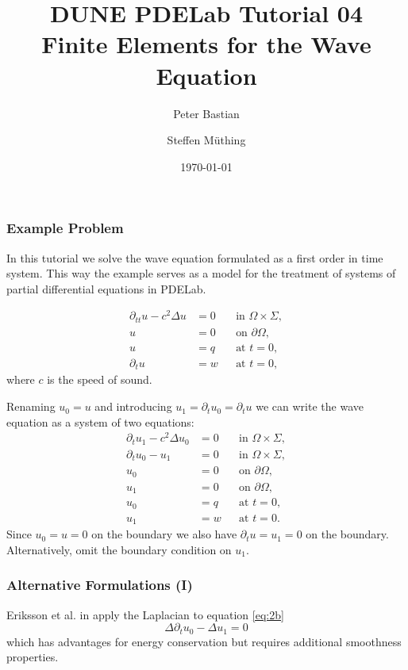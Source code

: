 \documentclass[ignorenonframetext,11pt]{beamer}
\title{DUNE PDELab Tutorial 04\\
  {\small Finite Elements for the Wave Equation}}
\author{Peter Bastian \and Steffen Müthing}
\institute[]
  {
   Interdisziplinäres Zentrum für Wissenschaftliches Rechnen\\
   Im Neuenheimer Feld 368, D-69120 Heidelberg \\[6pt]
  }
\date[\today]{\today}
\theoremstyle{definition}
\begin{document}
\frame{\titlepage}



\begin{frame}
\frametitle{Example Problem}
 In this tutorial we solve the wave equation formulated as a first order
in time system. This way the example serves as a model for the
treatment of systems of partial differential equations in PDELab.

\begin{subequations}
\label{eq:WaveEquation}
\begin{align}
\partial_{tt} u-c^2\Delta u  &= 0 &&\text{in $\Omega\times\Sigma$},\\
u &= 0 &&\text{on $\partial\Omega$},\\
u &= q &&\text{at $t=0$},\\
\partial_t u &= w &&\text{at $t=0$},
\end{align}
\end{subequations}
where $c$ is the speed of sound.
\end{frame}
\begin{frame}
Renaming $u_0=u$ and introducing $u_1=\partial_t u_0 =\partial_t u$ we can write the wave equation as a system of two equations:
\begin{subequations}
\label{eq:SystemForm1}
\begin{align}
\partial_t u_1 - c^2\Delta u_0 &=0 &&\text{in $\Omega\times\Sigma$}, \label{eq:2a}\\
\partial_t u_0 - u_1 &=0 &&\text{in $\Omega\times\Sigma$}, \label{eq:2b}\\
u_0 &= 0 &&\text{on $\partial\Omega$},\\
u_1 &= 0 &&\text{on $\partial\Omega$},\\
u_0 &= q &&\text{at $t=0$},\\
u_1 &= w &&\text{at $t=0$}.
\end{align}
\end{subequations}
Since $u_0=u=0$ on the boundary we also have $\partial_t u = u_1 = 0$ on the boundary.
Alternatively, omit the boundary condition on $u_1$.
\end{frame}


\begin{frame}
\frametitle{Alternative Formulations (I)}
Eriksson et al. in \cite{Eriksson} apply the Laplacian to
equation \eqref{eq:2b}
\begin{equation}
\Delta \partial_t u_0 - \Delta u_1 = 0
\end{equation} \label{eq:Eriksson}
which has advantages for energy conservation but requires additional smoothness
properties.
\end{frame}
\end{document}
